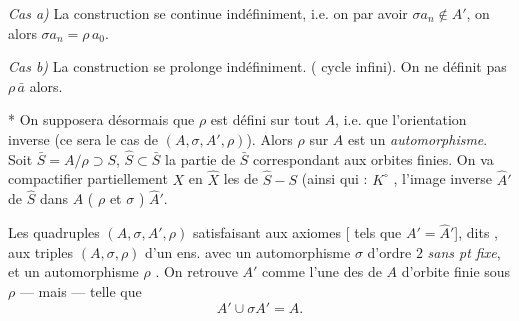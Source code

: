 \documentclass[11pt,a4paper]{article}
\begin{document}

\emph{Cas a)} La construction  \ill{} se continue
indéfiniment, i.e. on  par avoir $\sigma a_n \notin A'$,
on  alors $\sigma a_n = \rho\, a_0$.


\emph{Cas b)} La construction se prolonge indéfiniment.
( 
 cycle infini). On ne définit pas $\rho\, \bar a$ alors.

* On supposera désormais que $\rho$ est défini
 sur tout $A$, i.e. \ill{} que
l'orientation inverse (ce sera le cas de $(A, \sigma, A', \rho)$). Alors
$\rho$ sur $A$ est un \emph{automorphisme}. Soit
$\bar S = A/\rho \supset S$, $\hat S \subset \bar S$ la partie de $\bar S$
correspondant aux orbites finies. On va compactifier partiellement $X$ en
$\hat X$ \struck{\ill{}}  les  de
$\hat S - S$ (ainsi \ill{} qui : $K^{\circ}$ \ill{}, l'image inverse
$\hat A'$ de $\hat S$ dans $A$ (\ill{} \ill{} \ill{} $\rho$ et $\sigma$
\ill{})  \ill{} $\hat A'$.





Les quadruples $(A, \sigma, A', \rho)$ satisfaisant aux axiomes
[ tels que $A' = \hat A'$], dits \ill{},
 aux  triples $(A, \sigma, \rho)$
d'un ens. \emph{} avec un automorphisme $\sigma$ d'ordre
$2$ \emph{sans pt fixe}, et un automorphisme $\rho$
\emph{}. On retrouve $A'$ comme l'une des \ill{} de
$A$ d'orbite finie sous $\rho$ --- mais --- telle que
\[
A' \cup \sigma A' = A .
\]

\end{document}
